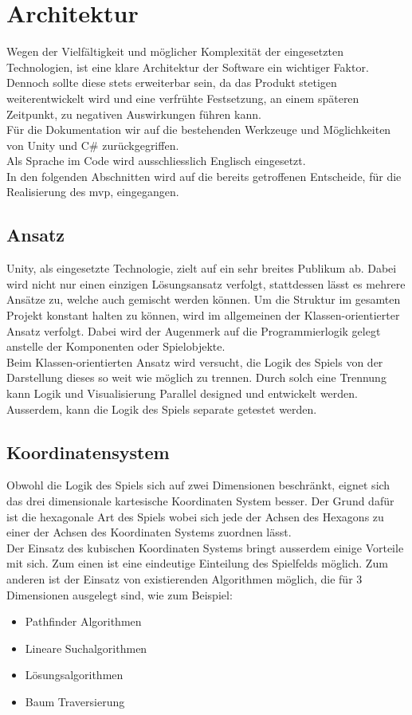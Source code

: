 \documentclass[../main.tex]{subfiles}
\begin{document}
	\section{Architektur}
	Wegen der Vielfältigkeit und möglicher Komplexität der eingesetzten Technologien, ist eine klare Architektur der Software ein wichtiger Faktor. Dennoch sollte diese stets erweiterbar sein, da das Produkt stetigen weiterentwickelt wird und eine verfrühte Festsetzung, an einem späteren Zeitpunkt, zu negativen Auswirkungen führen kann.\\
	Für die Dokumentation wir auf die bestehenden Werkzeuge und Möglichkeiten von Unity und C\# zurückgegriffen.\\
	Als Sprache im Code wird ausschliesslich Englisch eingesetzt.\\
	In den folgenden Abschnitten wird auf die bereits getroffenen Entscheide, für die Realisierung des \gls{mvp}, eingegangen.
	
	\subsection{Ansatz}
	Unity, als eingesetzte Technologie, zielt auf ein sehr breites Publikum ab. Dabei wird nicht nur einen einzigen Lösungsansatz verfolgt, stattdessen lässt es mehrere Ansätze zu, welche auch gemischt werden können. Um die Struktur im gesamten Projekt konstant halten zu können, wird im allgemeinen der Klassen-orientierter Ansatz verfolgt. Dabei wird der Augenmerk auf die Programmierlogik gelegt anstelle der Komponenten oder Spielobjekte.\\
	Beim Klassen-orientierten Ansatz wird versucht, die Logik des Spiels von der Darstellung dieses so weit wie möglich zu trennen. Durch solch eine Trennung kann Logik und Visualisierung Parallel designed und entwickelt werden. Ausserdem, kann die Logik des Spiels separate getestet werden.
	
	
	\subsection{Koordinatensystem}
	\label{coordinatessystem}
	Obwohl die Logik des Spiels sich auf zwei Dimensionen beschränkt, eignet sich das drei dimensionale kartesische Koordinaten System besser. Der Grund dafür ist die hexagonale Art des Spiels wobei sich jede der Achsen des Hexagons zu einer der Achsen des Koordinaten Systems zuordnen lässt.\\
	Der Einsatz des kubischen Koordinaten Systems bringt ausserdem einige Vorteile mit sich. Zum einen ist eine eindeutige Einteilung des Spielfelds möglich. Zum anderen ist der Einsatz von existierenden Algorithmen möglich, die für 3 Dimensionen ausgelegt sind, wie zum Beispiel:
	\begin{itemize}
		\item Pathfinder Algorithmen
		\item Lineare Suchalgorithmen
		\item Lösungsalgorithmen
		\item Baum Traversierung
	\end{itemize}
		
\end{document}
